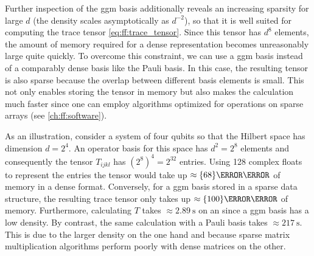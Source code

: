 Further inspection of the \gls{ggm} basis additionally reveals an increasing sparsity for large $d$ (the density scales asymptotically as $d^{-2}$), so that it is well suited for computing the trace tensor \cref{eq:ff:trace_tensor}.
Since this tensor has $d^8$ elements, the amount of memory required for a dense representation becomes unreasonably large quite quickly.
To overcome this constraint, we can use a \gls{ggm} basis instead of a comparably dense basis like the Pauli basis.
In this case, the resulting tensor is also sparse because the overlap between different basis elements is small.
This not only enables storing the tensor in memory but also makes the calculation much faster since one can employ algorithms optimized for operations on sparse arrays (see \cref{ch:ff:software}).

As an illustration, consider a system of four qubits so that the Hilbert space has dimension $d = 2^4$.
An operator basis for this space has $d^2 = 2^8$ elements and consequently the tensor $T_{ijkl}$ has $(2^8)^4 = 2^{32}$ entries.
Using \qty{128}{\bit} complex floats to represent the entries the tensor would take up $\approx\qty{68}{\giga\byte}$ of memory in a dense format.
Conversely, for a \gls{ggm} basis stored in a sparse data structure, the resulting trace tensor only takes up $\approx\qty{100}{\mega\byte}$ of memory.
Furthermore, calculating $T$ takes $\approx\qty{2.89}{\second}$ on an \fastprocessor since a \gls{ggm} basis has a low density.
By contrast, the same calculation with a Pauli basis takes $\approx\qty{217}{\second}$.
This is due to the larger density on the one hand and because sparse matrix multiplication algorithms perform poorly with dense matrices on the other.

